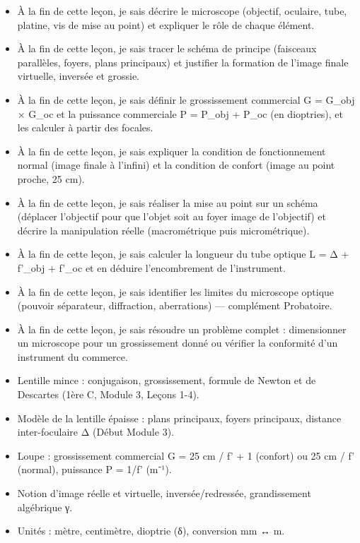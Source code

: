 \documentclass[11pt]{article}
\begin{document}
\begin{objectifs}
\begin{itemize}
\item À la fin de cette leçon, je sais décrire le microscope (objectif, oculaire, tube, platine, vis de mise au point) et expliquer le rôle de chaque élément.
\item À la fin de cette leçon, je sais tracer le schéma de principe (faisceaux parallèles, foyers, plans principaux) et justifier la formation de l'image finale virtuelle, inversée et grossie.
\item À la fin de cette leçon, je sais définir le grossissement commercial G = G\_obj × G\_oc et la puissance commerciale P = P\_obj + P\_oc (en dioptries), et les calculer à partir des focales.
\item À la fin de cette leçon, je sais expliquer la condition de fonctionnement normal (image finale à l'infini) et la condition de confort (image au point proche, 25 cm).
\item À la fin de cette leçon, je sais réaliser la mise au point sur un schéma (déplacer l'objectif pour que l'objet soit au foyer image de l'objectif) et décrire la manipulation réelle (macrométrique puis micrométrique).
\item À la fin de cette leçon, je sais calculer la longueur du tube optique L = Δ + f'\_obj + f'\_oc et en déduire l'encombrement de l'instrument.
\item À la fin de cette leçon, je sais identifier les limites du microscope optique (pouvoir séparateur, diffraction, aberrations) — complément Probatoire.
\item À la fin de cette leçon, je sais résoudre un problème complet : dimensionner un microscope pour un grossissement donné ou vérifier la conformité d'un instrument du commerce.
\end{itemize}
\end{objectifs}

\begin{prerequis}
\begin{itemize}
\item Lentille mince : conjugaison, grossissement, formule de Newton et de Descartes (1ère C, Module 3, Leçons 1-4).
\item Modèle de la lentille épaisse : plans principaux, foyers principaux, distance inter-foculaire Δ (Début Module 3).
\item Loupe : grossissement commercial G = 25 cm / f' + 1 (confort) ou 25 cm / f' (normal), puissance P = 1/f' (m⁻¹).
\item Notion d'image réelle et virtuelle, inversée/redressée, grandissement algébrique γ.
\item Unités : mètre, centimètre, dioptrie (δ), conversion mm ↔ m.
\end{itemize}
\end{prerequis}
\end{document}
